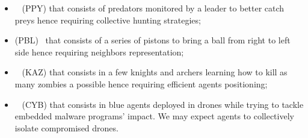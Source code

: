 \documentclass[runningheads]{llncs}
\begin{document}
\hspace{-0.6cm}
\begin{minipage}[t]{0.65\textwidth}

    \begin{itemize}
        \item {}~\cite{Lowe2017} (PPY) that consists of predators monitored by a leader to better catch preys hence requiring collective hunting strategies;
        \item {} (PBL)~\cite{Terry2021} that consists of a series of pistons to bring a ball from right to left side hence requiring neighbors representation;
        \item {}~\cite{Terry2021} (KAZ) that consists in a few knights and archers learning how to kill as many zombies a possible hence requiring efficient agents positioning;
        \item {}~\cite{cage_challenge_3_announcement} (CYB) that consists in blue agents deployed in drones while trying to tackle embedded malware programs' impact. We may expect agents to \allowbreak collectively isolate compromised drones.
    \end{itemize}

\end{minipage}%
\hfill %
\end{document}
